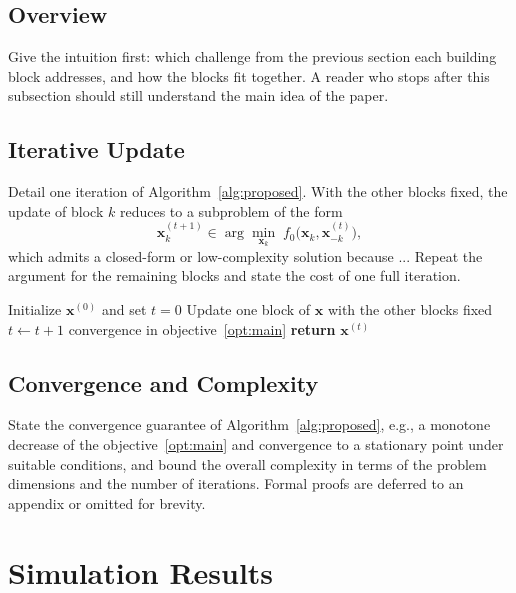 \documentclass[conference]{IEEEtran}
\begin{document}
\subsection{Overview}
Give the intuition first: which challenge from the previous section each building block addresses, and how the blocks fit together. A reader who stops after this subsection should still understand the main idea of the paper.

\subsection{Iterative Update}
Detail one iteration of Algorithm~\ref{alg:proposed}. With the other blocks fixed, the update of block $k$ reduces to a subproblem of the form
\begin{equation}\label{eq:update}
\mathbf{x}_{k}^{(t+1)} \in \arg\min_{\mathbf{x}_{k}}\; f_0\big(\mathbf{x}_{k}, \mathbf{x}_{-k}^{(t)}\big),
\end{equation}
which admits a closed-form or low-complexity solution because ... Repeat the argument for the remaining blocks and state the cost of one full iteration.

\begin{algorithm}[!t]
\caption{Proposed Algorithm}
\label{alg:proposed}
\begin{algorithmic}[1]
\STATE Initialize $\mathbf{x}^{(0)}$ and set $t = 0$
\REPEAT
\STATE Update one block of $\mathbf{x}$ with the other blocks fixed
\STATE $t \leftarrow t + 1$
\UNTIL convergence in objective~\eqref{opt:main}
\STATE \textbf{return} $\mathbf{x}^{(t)}$
\end{algorithmic}
\end{algorithm}

\subsection{Convergence and Complexity}
State the convergence guarantee of Algorithm~\ref{alg:proposed}, e.g., a monotone decrease of the objective~\eqref{opt:main} and convergence to a stationary point under suitable conditions, and bound the overall complexity in terms of the problem dimensions and the number of iterations. Formal proofs are deferred to an appendix or omitted for brevity.

\section{Simulation Results}\label{sec:results}
\end{document}
